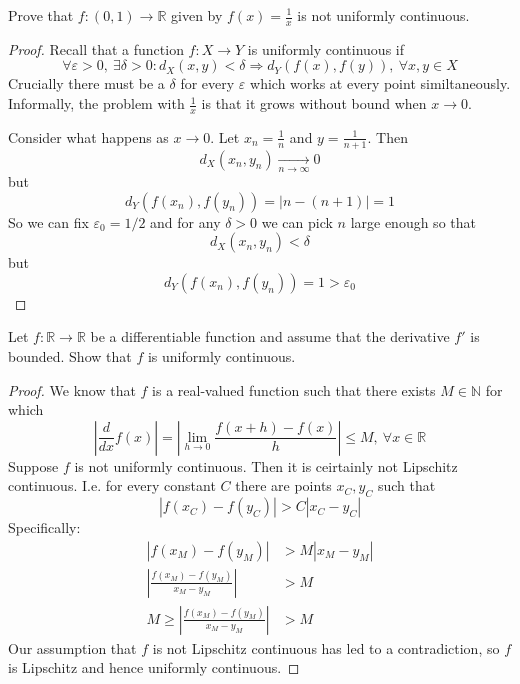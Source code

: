 \begin{prob}
    Prove that $f:(0,1) \to \mathbb R$ given by $f(x) = \frac{1}{x}$
    is not uniformly continuous.
\end{prob}
\begin{proof}
    Recall that a function $f : X \to Y$ is uniformly continuous 
    if 
    \[
        \forall \varepsilon > 0, \: \exists \delta > 0 : 
        d_X(x,y) < \delta \Rightarrow d_Y(f(x),f(y)), 
        \: \forall x,y \in X
    \]
    Crucially there must be a $\delta$ for every $\varepsilon$ 
    which works at every point similtaneously.
    Informally, the problem with $\frac{1}{x}$ is that 
    it grows without bound when $x \to 0$. 
    
    Consider what happens as $x \to 0$. 
    Let $x_n = \frac{1}{n}$ and $y = \frac{1}{n+1}$. 
    Then 
    \[
        d_X(x_n, y_n) \underset{n\to\infty}{\to} 0
    \]
    but 
    \[
        d_Y(f(x_n),f(y_n)) = |n - (n + 1)| = 1
    \]
    So we can fix $\varepsilon_0 = 1/2$ and for 
    any $\delta > 0$ we can pick $n$ large enough so that 
    \[
        d_X(x_n,y_n) < \delta
    \]
    but 
    \[
        d_Y(f(x_n),f(y_n)) = 1 > \varepsilon_0
    \]
    
\end{proof}
\begin{prob}
    Let $f : \mathbb R \to \mathbb R$ be a differentiable 
    function and assume that the derivative 
    $f'$ is bounded. Show that $f$ is uniformly continuous. 
\end{prob}
\begin{proof}
    We know that $f$ is a real-valued function such that there 
    exists $M \in \mathbb N$ for which
    \[
        \left|\frac{d}{dx}f(x)\right| = 
        \left|\lim_{h \to 0}\frac{f(x+h)-f(x)}{h}\right|
        \leq M, \: \forall x \in \mathbb R
    \]
    Suppose $f$ is not uniformly continuous. Then it is ceirtainly 
    not Lipschitz continuous. I.e. for every constant $C$ 
    there are points $x_C, y_C$ such that
    \[
        |f(x_C) - f(y_C)| > C|x_C-y_C| 
    \]
    Specifically: 
    \begin{align*}
        |f(x_M)-f(y_M)| &> M|x_M-y_M| 
        \\ 
        \left|\frac{f(x_M)-f(y_M)}{x_M-y_M}\right| &> M \\ 
        M \geq \left|\frac{f(x_M)-f(y_M)}{x_M-y_M}\right| &> M
    \end{align*}
    Our assumption that $f$ is not Lipschitz continuous 
    has led to a contradiction, so $f$ is Lipschitz and hence 
    uniformly continuous.
\end{proof}

